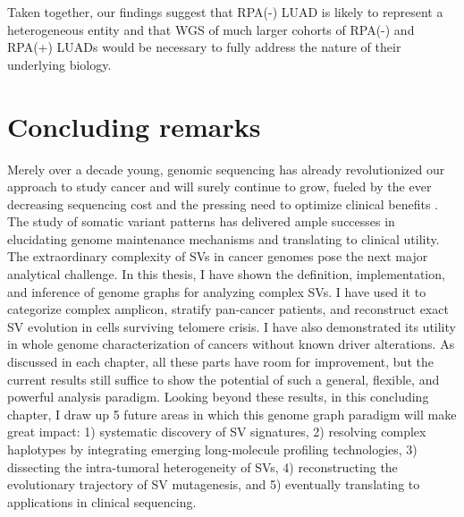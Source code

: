 \documentclass[phd,tocprelim]{cornell}
\begin{document}
Taken together, our findings suggest that RPA(-) LUAD is likely to represent a heterogeneous entity and that WGS of much larger cohorts of RPA(-) and RPA(+) LUADs would be necessary to fully address the nature of their underlying biology.

\chapter{Concluding remarks} \label{chap:conclude}
Merely over a decade young, genomic sequencing has already revolutionized our approach to study cancer and will surely continue to grow, fueled by the ever decreasing sequencing cost and the pressing need to optimize clinical benefits \cite{Stratton2009-ty}. The study of somatic variant patterns has delivered ample successes in elucidating genome maintenance mechanisms and translating to clinical utility. The extraordinary complexity of SVs in cancer genomes pose the next major analytical challenge. In this thesis, I have shown the definition, implementation, and inference of genome graphs for analyzing complex SVs. I have used it to categorize complex amplicon, stratify pan-cancer patients, and reconstruct exact SV evolution in cells surviving telomere crisis. I have also demonstrated its utility in whole genome characterization of cancers without known driver alterations. As discussed in each chapter, all these parts have room for improvement, but the current results still suffice to show the potential of such a general, flexible, and powerful analysis paradigm. Looking beyond these results, in this concluding chapter, I draw up 5 future areas in which this genome graph paradigm will make great impact: 1) systematic discovery of SV signatures, 2) resolving complex haplotypes by integrating emerging long-molecule profiling technologies, 3) dissecting the intra-tumoral heterogeneity of SVs, 4) reconstructing the evolutionary trajectory of SV mutagenesis, and 5) eventually translating to applications in clinical sequencing.

\end{document}
